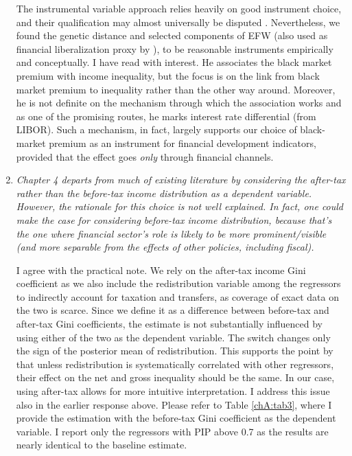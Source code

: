 \begin{enumerate}
    The instrumental variable approach relies heavily on good instrument choice, and their qualification may almost universally be disputed \parencite{deaton2010instruments}. Nevertheless, we found the genetic distance and selected components of EFW (also used as financial liberalization proxy by \textcite{de2017finance}), to be reasonable instruments empirically and conceptually. I have read \textcite{sylwester2003changes} with interest. He associates the black market premium with income inequality, but the focus is on the link from black market premium to inequality rather than the other way around. Moreover, he is not definite on the mechanism through which the association works and as one of the promising routes, he marks interest rate differential (from LIBOR). Such a mechanism, in fact, largely supports our choice of black-market premium as an instrument for financial development indicators, provided that the effect goes \emph{only} through financial channels. 
        
    \item \textit{Chapter 4 departs from much of existing literature by considering the after-tax rather than the before-tax income distribution as a dependent variable. However, the rationale for this choice is not well explained. In fact, one could make the case for considering before-tax income distribution, because that's the one where financial sector's role is likely to be more prominent/visible (and more separable from the effects of other policies, including fiscal).}
    
    I agree with the practical note. We rely on the after-tax income Gini coefficient as we also include the redistribution variable among the regressors to indirectly account for taxation and transfers, as coverage of exact data on the two is scarce. Since we define it as a difference between before-tax and after-tax Gini coefficients, the estimate is not substantially influenced by using either of the two as the dependent variable. The switch changes only the sign of the posterior mean of redistribution. This supports the point by \textcite{furceri2019robust} that unless redistribution is systematically correlated with other regressors, their effect on the net and gross inequality should be the same. In our case, using after-tax allows for more intuitive interpretation. I address this issue also in the earlier response above. Please refer to Table \ref{chA:tab3}, where I provide the estimation with the before-tax Gini coefficient as the dependent variable. I report only the regressors with \ac{PIP} above 0.7 as the results are nearly identical to the baseline estimate. 


\end{enumerate}
